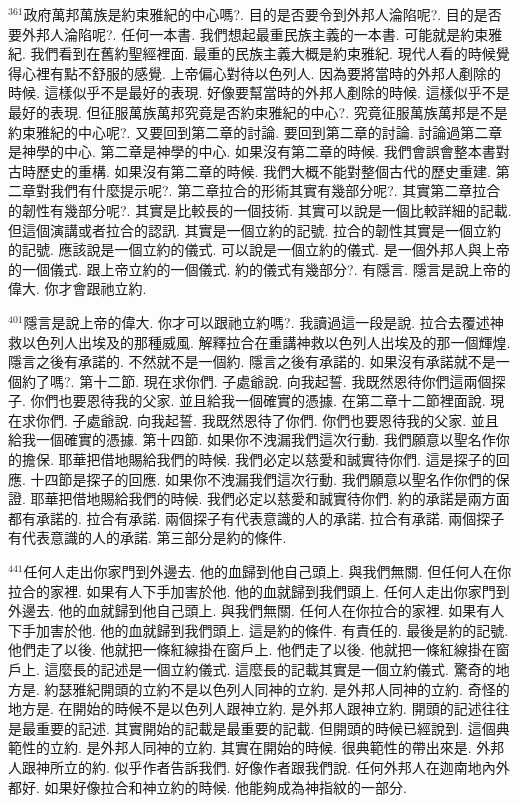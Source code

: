 \documentclass{book}
\begin{document}
$^{361}$政府萬邦萬族是約束雅紀的中心嗎?.
目的是否要令到外邦人淪陷呢?.
目的是否要外邦人淪陷呢?.
任何一本書.
我們想起最重民族主義的一本書.
可能就是約束雅紀.
我們看到在舊約聖經裡面.
最重的民族主義大概是約束雅紀.
現代人看的時候覺得心裡有點不舒服的感覺.
上帝偏心對待以色列人.
因為要將當時的外邦人剷除的時候.
這樣似乎不是最好的表現.
好像要幫當時的外邦人剷除的時候.
這樣似乎不是最好的表現.
但征服萬族萬邦究竟是否約束雅紀的中心?.
究竟征服萬族萬邦是不是約束雅紀的中心呢?.
又要回到第二章的討論.
要回到第二章的討論.
討論過第二章是神學的中心.
第二章是神學的中心.
如果沒有第二章的時候.
我們會誤會整本書對古時歷史的重構.
如果沒有第二章的時候.
我們大概不能對整個古代的歷史重建.
第二章對我們有什麼提示呢?.
第二章拉合的形術其實有幾部分呢?.
其實第二章拉合的韌性有幾部分呢?.
其實是比較長的一個技術.
其實可以說是一個比較詳細的記載.
但這個演講或者拉合的認訊.
其實是一個立約的記號.
拉合的韌性其實是一個立約的記號.
應該說是一個立約的儀式.
可以說是一個立約的儀式.
是一個外邦人與上帝的一個儀式.
跟上帝立約的一個儀式.
約的儀式有幾部分?.
有隱言.
隱言是說上帝的偉大.
你才會跟祂立約.

$^{401}$隱言是說上帝的偉大.
你才可以跟祂立約嗎?.
我讀過這一段是說.
拉合去覆述神救以色列人出埃及的那種威風.
解釋拉合在重講神救以色列人出埃及的那一個輝煌.
隱言之後有承諾的.
不然就不是一個約.
隱言之後有承諾的.
如果沒有承諾就不是一個約了嗎?.
第十二節.
現在求你們.
子處爺說.
向我起誓.
我既然恩待你們這兩個探子.
你們也要恩待我的父家.
並且給我一個確實的憑據.
在第二章十二節裡面說.
現在求你們.
子處爺說.
向我起誓.
我既然恩待了你們.
你們也要恩待我的父家.
並且給我一個確實的憑據.
第十四節.
如果你不洩漏我們這次行動.
我們願意以聖名作你的擔保.
耶華把借地賜給我們的時候.
我們必定以慈愛和誠實待你們.
這是探子的回應.
十四節是探子的回應.
如果你不洩漏我們這次行動.
我們願意以聖名作你們的保證.
耶華把借地賜給我們的時候.
我們必定以慈愛和誠實待你們.
約的承諾是兩方面都有承諾的.
拉合有承諾.
兩個探子有代表意識的人的承諾.
拉合有承諾.
兩個探子有代表意識的人的承諾.
第三部分是約的條件.

$^{441}$任何人走出你家門到外邊去.
他的血歸到他自己頭上.
與我們無關.
但任何人在你拉合的家裡.
如果有人下手加害於他.
他的血就歸到我們頭上.
任何人走出你家門到外邊去.
他的血就歸到他自己頭上.
與我們無關.
任何人在你拉合的家裡.
如果有人下手加害於他.
他的血就歸到我們頭上.
這是約的條件.
有責任的.
最後是約的記號.
他們走了以後.
他就把一條紅線掛在窗戶上.
他們走了以後.
他就把一條紅線掛在窗戶上.
這麼長的記述是一個立約儀式.
這麼長的記載其實是一個立約儀式.
驚奇的地方是.
約瑟雅紀開頭的立約不是以色列人同神的立約.
是外邦人同神的立約.
奇怪的地方是.
在開始的時候不是以色列人跟神立約.
是外邦人跟神立約.
開頭的記述往往是最重要的記述.
其實開始的記載是最重要的記載.
但開頭的時候已經說到.
這個典範性的立約.
是外邦人同神的立約.
其實在開始的時候.
很典範性的帶出來是.
外邦人跟神所立的約.
似乎作者告訴我們.
好像作者跟我們說.
任何外邦人在迦南地內外都好.
如果好像拉合和神立約的時候.
他能夠成為神指紋的一部分.
\end{document}
